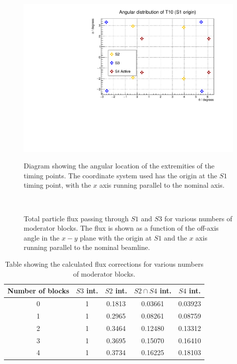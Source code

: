 	\begin{figure}[h]
		\begin{minipage}{0.49\textwidth}
			\centering
			\includegraphics[width=\textwidth]{files/Figures/beamlineAng.pdf}
			\caption{Diagram showing the angular location of the extremities of the timing points. The coordinate system used has the origin at the $S1$ timing 	point, with the $x$ axis running parallel to the nominal axis.}
			\label{fig:beamAng}
		\end{minipage}
		\hfill
		\begin{minipage}{0.49\textwidth}
			\begin{adjustbox}{max totalsize={\textwidth}{0.5\textheight}, center}
				
			\end{adjustbox}
			\caption{Total particle flux passing through $S1$ and $S3$ for various numbers of moderator blocks. The flux is shown as a function of the off-axis angle in the $x-y$ plane with the origin at $S1$ and the $x$ axis running parallel to the nominal beamline.}
			\label{fig:s1s3all}
		\end{minipage}
		\
	\end{figure}
		
	\begin{table}
		\centering
		\begin{tabular}{|c|c|c|c|c|}
			\hline
			Number of blocks & $S3$ int. & $S2$ int. & $S2 \cap S4$ int. & $S4$ int. \\
			\hline
			0 & 1 & 0.1813 & 0.03661 & 0.03923 \\
			1 & 1 & 0.2965 & 0.08261 & 0.08759 \\
			2 & 1 & 0.3464 & 0.12480 & 0.13312 \\
			3 & 1 & 0.3695 & 0.15070 & 0.16410 \\
			4 & 1 & 0.3734 & 0.16225 & 0.18103 \\
			\hline		
		\end{tabular}
		\caption{Table showing the calculated flux corrections for various numbers of moderator blocks.}
		\label{tab:fluxFactors}
	\end{table}
	